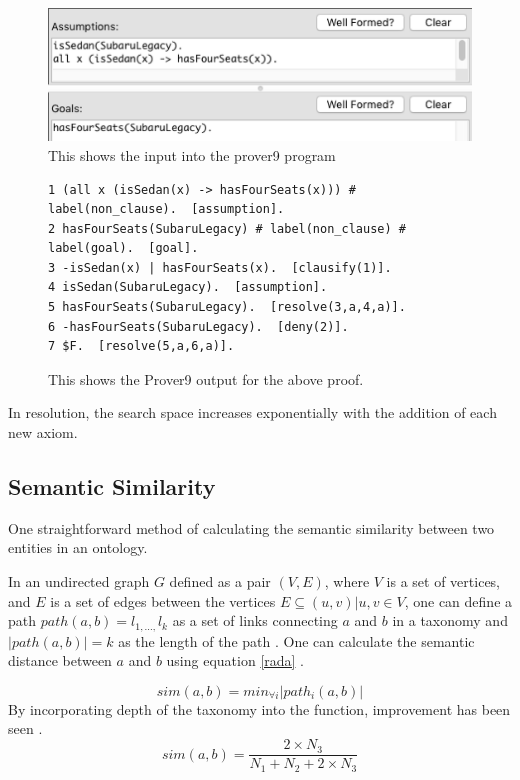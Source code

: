 \documentclass{article}
\begin{document}
\begin{figure}[h]
\centering
\includegraphics[width=6in]{prover9input}
\caption{This shows the input into the prover9 program}
\label{fig:prover9input}
\end{figure}

\begin{figure}[h]
\begin{verbatim}
1 (all x (isSedan(x) -> hasFourSeats(x))) # label(non_clause).  [assumption].
2 hasFourSeats(SubaruLegacy) # label(non_clause) # label(goal).  [goal].
3 -isSedan(x) | hasFourSeats(x).  [clausify(1)].
4 isSedan(SubaruLegacy).  [assumption].
5 hasFourSeats(SubaruLegacy).  [resolve(3,a,4,a)].
6 -hasFourSeats(SubaruLegacy).  [deny(2)].
7 $F.  [resolve(5,a,6,a)].
\end{verbatim}
\caption{This shows the Prover9 output for the above proof.}
\label{fig:prover9out}
\end{figure}

In resolution, the search space increases exponentially with the addition of each new axiom.

\subsection{{Semantic Similarity}}
One straightforward method of calculating the semantic similarity between two entities in an ontology. 

In an undirected graph $G$ defined as a pair $(V,E)$, where $V$ is a set of vertices, and $E$ is a set of edges between the vertices $E \subseteq {(u,v) | u, v \in V}$, one can define a path $path(a,b)=l_{1,\dots ,}l_k$ as a set of links connecting $a$ and $b$ in a taxonomy and $\lvert path(a,b) \rvert = k$ as the length of the path \cite{sanchez2012ontology}. One can calculate the semantic distance between $a$ and $b$ using equation \ref{rada} \cite{rada1989development}.

\begin{equation}
sim(a,b)=min_{\forall i}\lvert{path_i(a,b)}\rvert
\label{rada}
\end{equation}
By incorporating depth of the taxonomy into the function, improvement has been seen \cite{wu1994verbs}.
\begin{equation}
sim(a,b)=\frac{2 \times N_3}{N_1+N_2+2 \times N_3}
\label{wu}
\end{equation}
\end{document}
